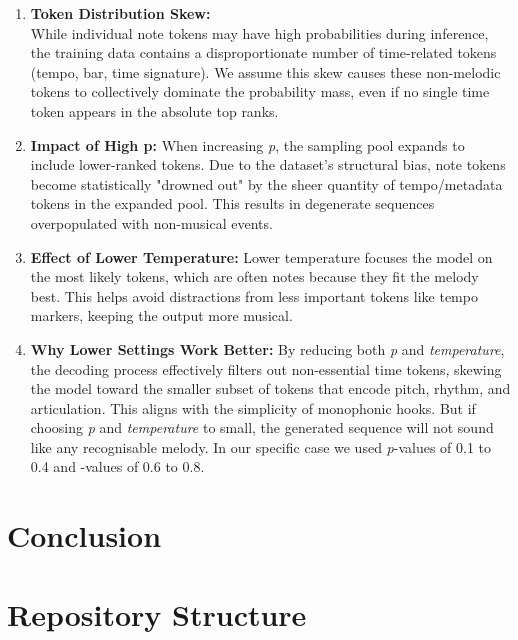 \documentclass[a4paper,12pt]{extarticle}
\begin{document}
\begin{enumerate}
    \item \textbf{Token Distribution Skew:}   \\
    While individual note tokens may have high probabilities during inference, the training data contains a disproportionate number of time-related tokens (tempo, bar, time signature).
    We assume this skew causes these non-melodic tokens to collectively dominate the probability mass, even if no single time token appears in the absolute top ranks.

    \item \textbf{Impact of High p:}  
    When increasing \textit{p}, the sampling pool expands to include lower-ranked tokens. Due to the dataset's structural bias,
    note tokens become statistically "drowned out" by the sheer quantity of tempo/metadata tokens in the expanded pool.
    This results in degenerate sequences overpopulated with non-musical events.

    \item \textbf{Effect of Lower Temperature:}  
    Lower temperature focuses the model on the most likely tokens, which are often notes because they fit the melody best. This helps avoid distractions from less important tokens like tempo markers, keeping the output more musical.

    \item \textbf{Why Lower Settings Work Better:}  
    By reducing both \textit{p} and \textit{temperature}, the decoding process effectively filters out non-essential time tokens, skewing the model toward the smaller subset of tokens that encode pitch, rhythm, and articulation.
    This aligns with the simplicity of monophonic hooks. But if choosing \textit{p} and \textit{temperature} to small, the generated sequence will not sound like any recognisable melody.
    In our specific case we used \textit{p}-values of 0.1 to 0.4 and -values of 0.6 to 0.8.
\end{enumerate}

\section{Conclusion}

\printbibliography

\appendix

\section{Repository Structure}
\end{document}
